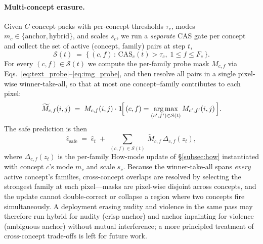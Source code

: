 \paragraph{Multi-concept erasure.}
Given $C$ concept packs with per-concept thresholds $\tau_c$, modes $m_c\!\in\!\{\text{anchor},\text{hybrid}\}$, and scales $s_c$, we run a \emph{separate} CAS gate per concept and collect the set of active (concept, family) pairs at step $t$,
\begin{equation*}
    \mathcal{S}(t) \;=\; \{\,(c,f)\,:\,\mathrm{CAS}_c(t) > \tau_c,\; 1 \le f \le F_c\,\}.
\end{equation*}
For every $(c,f) \in \mathcal{S}(t)$ we compute the per-family probe mask $M_{c,f}$ via Eqs.~\ref{eq:text_probe}--\ref{eq:img_probe}, and then resolve all pairs in a single pixel-wise winner-take-all, so that at most one concept--family contributes to each pixel:
\begin{equation}
    \widetilde{M}_{c,f}(i,j) \;=\; M_{c,f}(i,j)\cdot \mathbf{1}\!\Big[\,(c,f) = \operatorname*{arg\,max}_{(c',f')\in\mathcal{S}(t)} M_{c',f'}(i,j)\,\Big].
    \label{eq:multi_wta}
\end{equation}
The safe prediction is then
\begin{equation}
    \hat{\epsilon}_{\text{safe}} \;=\; \hat{\epsilon}_t \;+\; \sum_{(c,f)\in\mathcal{S}(t)}\,\widetilde{M}_{c,f}\,\Delta_{c,f}(z_t),
    \label{eq:multi}
\end{equation}
where $\Delta_{c,f}(z_t)$ is the per-family How-mode update of \S\ref{subsec:how} instantiated with concept $c$'s mode $m_c$ and scale $s_c$. Because the winner-take-all spans \emph{every} active concept's families, cross-concept overlaps are resolved by selecting the strongest family at each pixel---masks are pixel-wise disjoint across concepts, and the update cannot double-correct or collapse a region where two concepts fire simultaneously. A deployment erasing nudity and violence in the same pass may therefore run hybrid for nudity (crisp anchor) and anchor inpainting for violence (ambiguous anchor) without mutual interference; a more principled treatment of cross-concept trade-offs is left for future work.
